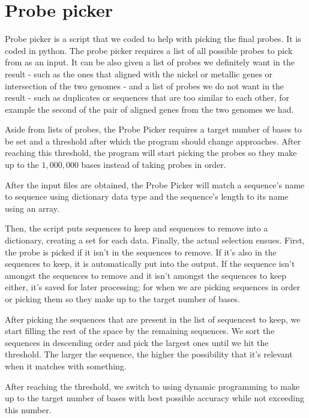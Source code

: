 \section{Probe picker}
Probe picker is a script that we coded to help with picking the final probes. It is coded in python. The probe picker requires 
a list of all possible probes to pick from as an input. It can be also given a list of probes we definitely want in the result - such as the 
ones that aligned with the nickel or metallic genes or intersection of the two genomes - and a list of probes we do not want in 
the result - such as duplicates or sequences that are too similar to each other, for 
example the second of the pair of aligned genes from the two genomes we had. 

Aside from lists of probes, the Probe Picker requires a target number of bases to be set and a threshold after which the program should 
change approaches. After reaching this threshold, the program will start picking the probes so they make up to the $1,000,000$ bases instead of 
taking probes in order. 

After the input files are obtained, the Probe Picker will match a sequence's name to sequence using dictionary data type and the sequence's length to 
its name using an array. 

Then, the script puts sequences to keep and sequences to remove into a dictionary, creating a set for each data. 
Finally, the actual selection ensues. 
First, the probe is picked if it isn't in the sequences to remove. If it's also in the sequences to keep, it is automatically put into the output. 
If the sequence isn't amongst the sequences to remove and it isn't amongst the sequences to keep either, it's saved for later processing; for when we are 
picking sequences in order or picking them so they make up to the target number of bases. 

After picking the sequences that are present in the list of sequencest to keep, we start filling the rest of the space by the remaining sequences. We sort the 
sequences in descending order and pick the largest ones until we hit the threshold. The larger the sequence, the higher the possibility that it's relevant 
when it matches with something. 

After reaching the threshold, we switch to using dynamic programming to make up to the target number of bases with best possible accuracy while not exceeding this 
number. 

